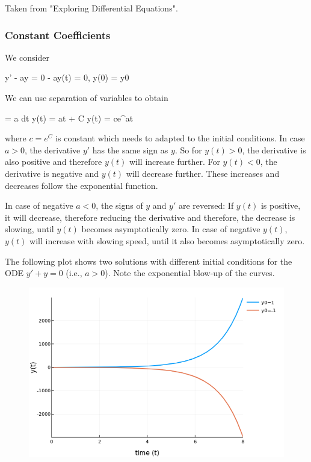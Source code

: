 
Taken from "Exploring Differential Equations".


\subsubsection{Constant Coefficients}

We consider

\bee
y' - ay = 0 \equiv {} - ay(t) = 0, \quad y(0) = y0
\eee

We can use separation of variables to obtain

\bee
{} = a dt \rightarrow \ln y(t) = at + C \rightarrow y(t) = ce^{at}
\eee

where $c = e^C$ is constant which needs to adapted to the initial conditions. In case $a>0$, the derivative $y'$ has the same sign as $y$. So for $y(t) > 0$, the derivative is also positive and therefore $y(t)$ will increase further. For $y(t) < 0$, the derivative is negative and $y(t)$ will decrease further. These increases and decreases follow the exponential function.

In case of negative $a<0$, the signs of $y$ and $y'$ are reversed: If $y(t)$ is positive, it will decrease, therefore reducing the derivative and therefore, the decrease is slowing, until $y(t)$ becomes asymptotically zero. In case of negative $y(t)$, $y(t)$ will increase with slowing speed, until it also becomes asymptotically zero.


The following plot shows two solutions with different initial conditions for the ODE $y'+y=0$ (i.e., $a>0$). Note the exponential blow-up of the curves.

\begin{figure}[H]
	\includegraphics[scale=0.5]{images/ode_01_01.png}
\end{figure}



